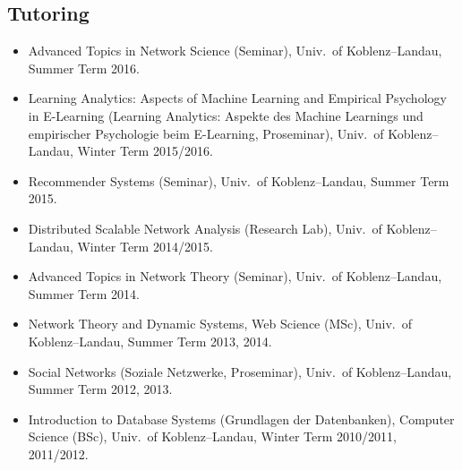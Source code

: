 \documentclass[line,mm]{res}
\newcounter{y}
\begin{document}
\begin{resume}
\section{Tutoring}
\begin{itemize}
\item Advanced Topics in Network Science (Seminar), Univ.\ of
  Koblenz--Landau, Summer Term 2016. 
\item Learning Analytics: Aspects of Machine Learning and Empirical Psychology in E-Learning (Learning
    Analytics: Aspekte des Machine Learnings und empirischer Psychologie
    beim E-Learning, Proseminar), Univ.\ of Koblenz--Landau, Winter Term 2015/2016.
\item Recommender Systems (Seminar), Univ.\ of Koblenz--Landau, Summer Term 2015.
\item Distributed Scalable Network Analysis (Research Lab), Univ.\ of
  Koblenz--Landau, Winter Term 2014/2015. 
\item Advanced Topics in Network Theory (Seminar), Univ.\ of
  Koblenz--Landau, Summer Term 2014. 
\item Network Theory and Dynamic Systems, Web Science (MSc), Univ.\ of
  Koblenz--Landau, Summer Term 2013, 2014.
\item Social Networks (Soziale Netzwerke, Proseminar), Univ.\ of
  Koblenz--Landau, Summer Term 2012, 2013.
\item
  Introduction to Database Systems (Grundlagen der Datenbanken),
  Computer Science (BSc), Univ.\ of
  Koblenz--Landau, Winter Term 2010/2011, 2011/2012. 
\end{itemize}


\end{resume}
\end{document}
